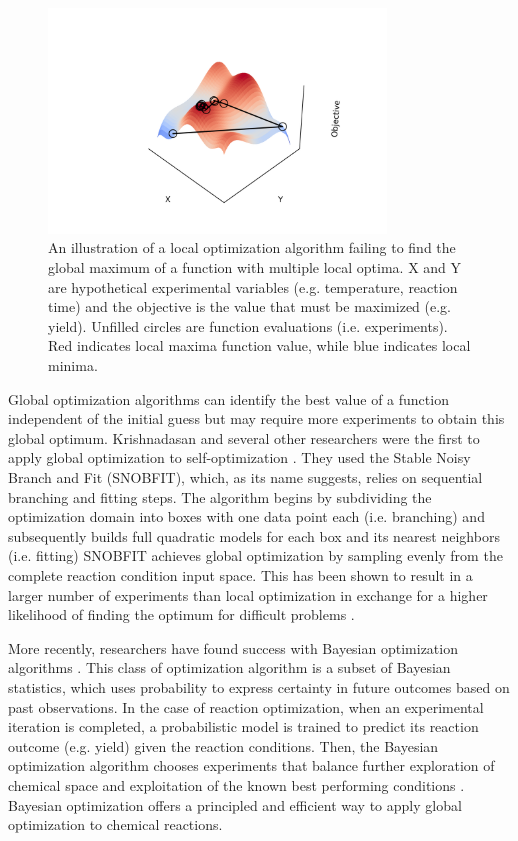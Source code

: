 \begin{figure}
    \centering
    \includegraphics[width=0.8\textwidth]{gfx/Chapter02/local_optimzation.png}
    \caption{An illustration of a local optimization algorithm failing to find the global maximum of a function with multiple local optima. X and Y are hypothetical experimental variables (e.g. temperature, reaction time) and the objective is the value that must be maximized (e.g. yield). Unfilled circles are function evaluations (i.e. experiments). Red indicates local maxima function value, while blue indicates local minima.}
    \label{fig:local-optimization}
\end{figure}
 
Global optimization algorithms can identify the best value of a function independent of the initial guess but may require more experiments to obtain this global optimum. Krishnadasan and several other researchers were the first to apply global optimization to self-optimization \cite{Holmes2016b, Krishnadasan2007, McMullen2010a}. They used the Stable Noisy Branch and Fit (SNOBFIT), which, as its name suggests, relies on sequential branching and fitting steps. The algorithm begins by subdividing the optimization domain into boxes with one data point each (i.e. branching) and subsequently builds full quadratic models for each box and its nearest neighbors (i.e. fitting) \cite{Huyer2008.} SNOBFIT achieves global optimization by sampling evenly from the complete reaction condition input space. This has been shown to result in a larger number of experiments than local optimization in exchange for a higher likelihood of finding the optimum for difficult problems \cite{McMullen2010a}.

More recently, researchers have found success with Bayesian optimization algorithms \cite{Schweidtmann2018, Amar2019, Hase2020, Shields2021, Manson2021}. This class of optimization algorithm is a subset of Bayesian statistics, which uses probability to express certainty in future outcomes based on past observations. In the case of reaction optimization, when an experimental iteration is completed, a probabilistic model is trained to predict its reaction outcome (e.g. yield) given the reaction conditions. Then, the Bayesian optimization algorithm chooses experiments that balance further exploration of chemical space and exploitation of the known best performing conditions \cite{Shahriari2016}. Bayesian optimization offers a principled and efficient way to apply global optimization to chemical reactions. 

